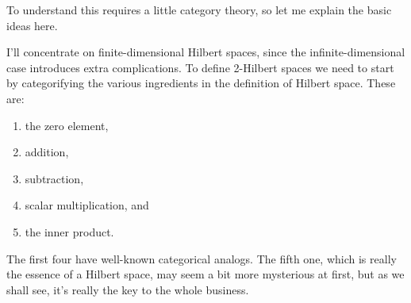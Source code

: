 \documentclass{article}
\def\tightlist{}
\begin{document}
To understand this requires a little category theory, so let me explain
the basic ideas here.

I'll concentrate on finite-dimensional Hilbert spaces, since the
infinite-dimensional case introduces extra complications. To define
2-Hilbert spaces we need to start by categorifying the various
ingredients in the definition of Hilbert space. These are:

\begin{enumerate}
\def\labelenumi{\arabic{enumi}.}
\tightlist
\item
  the zero element,
\item
  addition,
\item
  subtraction,
\item
  scalar multiplication, and
\item
  the inner product.
\end{enumerate}

The first four have well-known categorical analogs. The fifth one, which
is really the essence of a Hilbert space, may seem a bit more mysterious
at first, but as we shall see, it's really the key to the whole
business.
\end{document}
